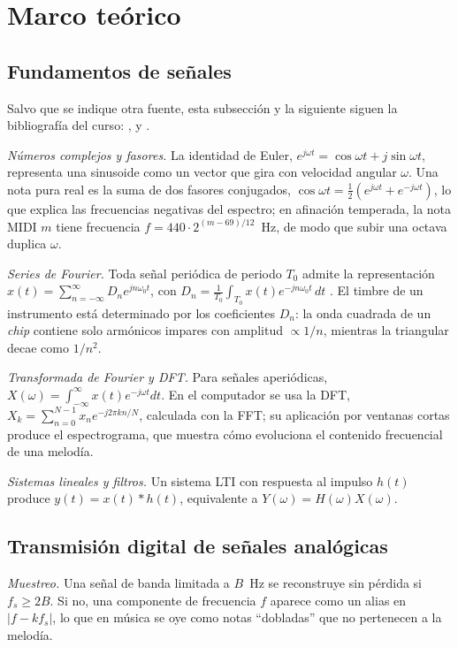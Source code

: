 \documentclass[conference]{IEEEtran}
\begin{document}
\section{Marco teórico}
\subsection{Fundamentos de señales}
Salvo que se indique otra fuente, esta subsección y la siguiente siguen la bibliografía del curso: \citet[caps.~2, 3, 5 y 6]{lathi2019}, \citet[caps.~1, 2 y 5]{hsu2003} y \citet[caps.~2 y 7]{haykin2009}.

\emph{Números complejos y fasores.} La identidad de Euler, $e^{j\omega t} = \cos\omega t + j\sin\omega t$, representa una sinusoide como un vector que gira con velocidad angular $\omega$. Una nota pura real es la suma de dos fasores conjugados, $\cos\omega t=\tfrac{1}{2}(e^{j\omega t}+e^{-j\omega t})$, lo que explica las frecuencias negativas del espectro; en afinación temperada, la nota MIDI $m$ tiene frecuencia $f = 440 \cdot 2^{(m-69)/12}$~Hz, de modo que subir una octava duplica $\omega$.

\emph{Series de Fourier.} Toda señal periódica de periodo $T_0$ admite la representación $x(t)=\sum_{n=-\infty}^{\infty} D_n e^{j n\omega_0 t}$, con $D_n = \frac{1}{T_0}\int_{T_0} x(t)e^{-jn\omega_0 t}\,dt$ \citep[sec.~2.9]{lathi2019}. El timbre de un instrumento está determinado por los coeficientes $D_n$: la onda cuadrada de un \emph{chip} contiene solo armónicos impares con amplitud $\propto 1/n$, mientras la triangular decae como $1/n^2$.

\emph{Transformada de Fourier y DFT.} Para señales aperiódicas, $X(\omega)=\int_{-\infty}^{\infty}x(t)e^{-j\omega t}dt$. En el computador se usa la DFT, $X_k=\sum_{n=0}^{N-1}x_n e^{-j2\pi kn/N}$, calculada con la FFT; su aplicación por ventanas cortas produce el espectrograma, que muestra cómo evoluciona el contenido frecuencial de una melodía.

\emph{Sistemas lineales y filtros.} Un sistema LTI con respuesta al impulso $h(t)$ produce $y(t)=x(t)*h(t)$, equivalente a $Y(\omega)=H(\omega)X(\omega)$.

\subsection{Transmisión digital de señales analógicas}
\emph{Muestreo.} Una señal de banda limitada a $B$~Hz se reconstruye sin pérdida si $f_s \geq 2B$. Si no, una componente de frecuencia $f$ aparece como un alias en $|f - k f_s|$, lo que en música se oye como notas ``dobladas'' que no pertenecen a la melodía.
\end{document}
